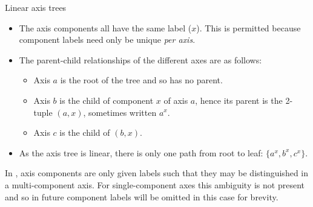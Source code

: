 \documentclass[thesis]{subfiles}
\begin{document}
\begin{example}{Linear axis trees}
\begin{itemize}
  \item
    The axis components all have the same label ($x$).
    This is permitted because component labels need only be unique \emph{per axis}.

  \item
    The parent-child relationships of the different axes are as follows:

    \begin{itemize}
      \item Axis $a$ is the root of the tree and so has no parent.
      \item Axis $b$ is the child of component $x$ of axis $a$, hence its parent is the 2-tuple $(a, x)$, sometimes written $a^x$.
      \item Axis $c$ is the child of $(b, x)$.
    \end{itemize}

  \item
    As the axis tree is linear, there is only one path from root to leaf: $\{ a^x, b^x, c^x \}$.
\end{itemize}

In , axis components are only given labels such that they may be distinguished in a multi-component axis.
For single-component axes this ambiguity is not present and so in future component labels will be omitted in this case for brevity.

\end{example}
\end{document}
